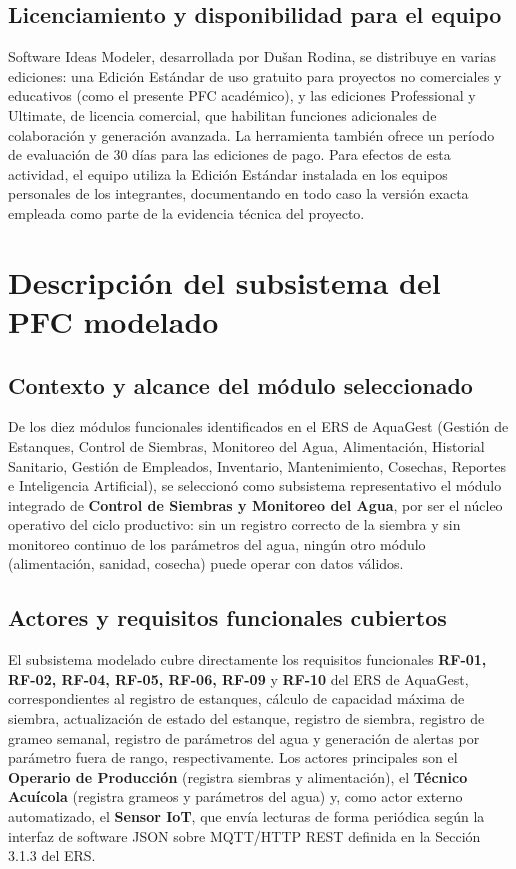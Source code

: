 \documentclass[11pt,a4paper]{article}
\begin{document}
\subsection{Licenciamiento y disponibilidad para el equipo}

Software Ideas Modeler, desarrollada por Dušan Rodina, se distribuye en varias ediciones: una Edición Estándar de uso gratuito para proyectos no comerciales y educativos (como el presente PFC académico), y las ediciones Professional y Ultimate, de licencia comercial, que habilitan funciones adicionales de colaboración y generación avanzada. La herramienta también ofrece un período de evaluación de 30 días para las ediciones de pago. Para efectos de esta actividad, el equipo utiliza la Edición Estándar instalada en los equipos personales de los integrantes, documentando en todo caso la versión exacta empleada como parte de la evidencia técnica del proyecto.

\section{Descripción del subsistema del PFC modelado}
\label{sec:subsistema}

\subsection{Contexto y alcance del módulo seleccionado}

De los diez módulos funcionales identificados en el ERS de AquaGest (Gestión de Estanques, Control de Siembras, Monitoreo del Agua, Alimentación, Historial Sanitario, Gestión de Empleados, Inventario, Mantenimiento, Cosechas, Reportes e Inteligencia Artificial), se seleccionó como subsistema representativo el módulo integrado de \textbf{Control de Siembras y Monitoreo del Agua}, por ser el núcleo operativo del ciclo productivo: sin un registro correcto de la siembra y sin monitoreo continuo de los parámetros del agua, ningún otro módulo (alimentación, sanidad, cosecha) puede operar con datos válidos.

\subsection{Actores y requisitos funcionales cubiertos}

El subsistema modelado cubre directamente los requisitos funcionales \textbf{RF-01, RF-02, RF-04, RF-05, RF-06, RF-09} y \textbf{RF-10} del ERS de AquaGest, correspondientes al registro de estanques, cálculo de capacidad máxima de siembra, actualización de estado del estanque, registro de siembra, registro de grameo semanal, registro de parámetros del agua y generación de alertas por parámetro fuera de rango, respectivamente. Los actores principales son el \textbf{Operario de Producción} (registra siembras y alimentación), el \textbf{Técnico Acuícola} (registra grameos y parámetros del agua) y, como actor externo automatizado, el \textbf{Sensor IoT}, que envía lecturas de forma periódica según la interfaz de software JSON sobre MQTT/HTTP REST definida en la Sección 3.1.3 del ERS.
\end{document}
